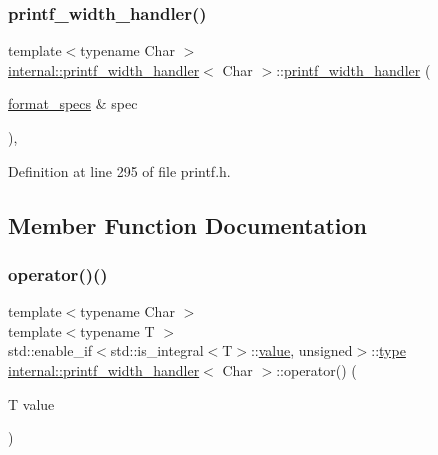 \subsubsection{\texorpdfstring{printf\+\_\+width\+\_\+handler()}{printf\_width\_handler()}}
{\footnotesize\ttfamily template$<$typename Char $>$ \\
\hyperlink{classinternal_1_1printf__width__handler}{internal\+::printf\+\_\+width\+\_\+handler}$<$ Char $>$\+::\hyperlink{classinternal_1_1printf__width__handler}{printf\+\_\+width\+\_\+handler} (\begin{DoxyParamCaption}\item[{\hyperlink{structbasic__format__specs}{format\+\_\+specs} \&}]{spec }\end{DoxyParamCaption})\hspace{0.3cm}{\ttfamily [inline]}, {\ttfamily [explicit]}}



Definition at line 295 of file printf.\+h.



\subsection{Member Function Documentation}
\mbox{\label{classinternal_1_1printf__width__handler_a5d2d31824dda4ca908be49b6c673a965}} 
\subsubsection{\texorpdfstring{operator()()}{operator()()}\hspace{0.1cm}{\footnotesize\ttfamily [1/2]}}
{\footnotesize\ttfamily template$<$typename Char $>$ \\
template$<$typename T $>$ \\
std\+::enable\+\_\+if$<$std\+::is\+\_\+integral$<$T$>$\+::\hyperlink{classinternal_1_1value}{value}, unsigned$>$\+::\hyperlink{namespaceinternal_a8661864098ac0acff9a6dd7e66f59038}{type} \hyperlink{classinternal_1_1printf__width__handler}{internal\+::printf\+\_\+width\+\_\+handler}$<$ Char $>$\+::operator() (\begin{DoxyParamCaption}\item[{T}]{value }\end{DoxyParamCaption})\hspace{0.3cm}{\ttfamily [inline]}}



